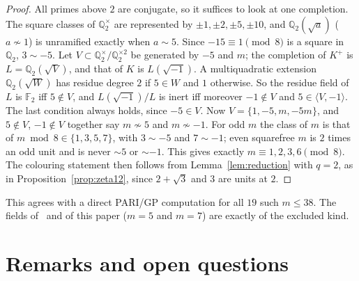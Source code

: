 \documentclass[11pt,a4paper]{amsart}
\theoremstyle{remark}
\newcommand{\Q}{\mathbb{Q}}
\newcommand{\F}{\mathbb{F}}
\begin{document}
\begin{proof}
All primes above $2$ are conjugate, so it suffices to look at one completion. The square classes of $\Q_2^\times$ are represented by $\pm1,\pm2,\pm5,\pm10$, and $\Q_2(\sqrt a)$ ($a\not\sim1$) is unramified exactly when $a\sim5$. Since $-15\equiv1\pmod8$ is a square in $\Q_2$, $3\sim-5$. Let $V\subset\Q_2^\times/\Q_2^{\times2}$ be generated by $-5$ and $m$; the completion of $K^+$ is $L=\Q_2(\sqrt V)$, and that of $K$ is $L(\sqrt{-1})$. A multiquadratic extension $\Q_2(\sqrt W)$ has residue degree $2$ if $5\in W$ and $1$ otherwise. So the residue field of $L$ is $\F_2$ iff $5\notin V$, and $L(\sqrt{-1})/L$ is inert iff moreover $-1\notin V$ and $5\in\langle V,-1\rangle$. The last condition always holds, since $-5\in V$. Now $V=\{1,-5,m,-5m\}$, and $5\notin V$, $-1\notin V$ together say $m\not\sim5$ and $m\not\sim-1$. For odd $m$ the class of $m$ is that of $m\bmod 8\in\{1,3,5,7\}$, with $3\sim-5$ and $7\sim-1$; even squarefree $m$ is $2$ times an odd unit and is never $\sim5$ or $\sim-1$. This gives exactly $m\equiv1,2,3,6\pmod8$. The colouring statement then follows from Lemma~\ref{lem:reduction} with $q=2$, as in Proposition~\ref{prop:zeta12}, since $2+\sqrt3$ and $3$ are units at $2$.
\end{proof}

This agrees with a direct PARI/GP computation for all $19$ such $m\le38$. The fields of~\cite{DN25} and of this paper ($m=5$ and $m=7$) are exactly of the excluded kind.

\section{Remarks and open questions}
\end{document}
